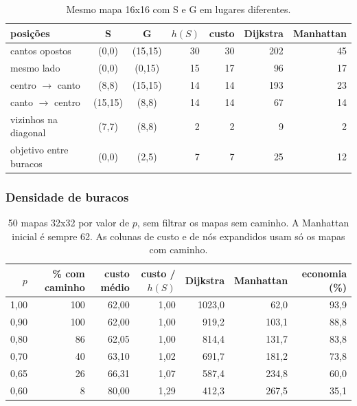 \documentclass[11pt,a4paper]{article}
\begin{document}
\begin{table}[H]
  \centering
  \small
  \caption{Mesmo mapa 16x16 com S e G em lugares diferentes.}
  \label{tab:posicoes}
  \begin{tabular}{lccrrrr}
    \toprule
    posições & S & G & $h(S)$ & custo & Dijkstra & Manhattan \\
    \midrule
    cantos opostos         & (0,0)   & (15,15) & 30 & 30 & 202 & 45 \\
    mesmo lado             & (0,0)   & (0,15)  & 15 & 17 &  96 & 17 \\
    centro $\to$ canto     & (8,8)   & (15,15) & 14 & 14 & 193 & 23 \\
    canto $\to$ centro     & (15,15) & (8,8)   & 14 & 14 &  67 & 14 \\
    vizinhos na diagonal   & (7,7)   & (8,8)   &  2 &  2 &   9 &  2 \\
    objetivo entre buracos & (0,0)   & (2,5)   &  7 &  7 &  25 & 12 \\
    \bottomrule
  \end{tabular}
\end{table}

\subsubsection*{Densidade de buracos}

\begin{table}[H]
  \centering
  \small
  \caption{50 mapas 32x32 por valor de $p$, sem filtrar os mapas sem caminho. A Manhattan inicial é sempre 62.
    As colunas de custo e de nós expandidos usam só os mapas com caminho.}
  \label{tab:densidade}
  \begin{tabular}{rrrrrrr}
    \toprule
    $p$ & \% com caminho & custo médio & custo / $h(S)$ & Dijkstra & Manhattan & economia (\%) \\
    \midrule
    1,00 & 100 & 62,00 & 1,00 & 1023,0 &  62,0 & 93,9 \\
    0,90 & 100 & 62,00 & 1,00 &  919,2 & 103,1 & 88,8 \\
    0,80 &  86 & 62,05 & 1,00 &  814,4 & 131,7 & 83,8 \\
    0,70 &  40 & 63,10 & 1,02 &  691,7 & 181,2 & 73,8 \\
    0,65 &  26 & 66,31 & 1,07 &  587,4 & 234,8 & 60,0 \\
    0,60 &   8 & 80,00 & 1,29 &  412,3 & 267,5 & 35,1 \\
    \bottomrule
  \end{tabular}
\end{table}
\end{document}
